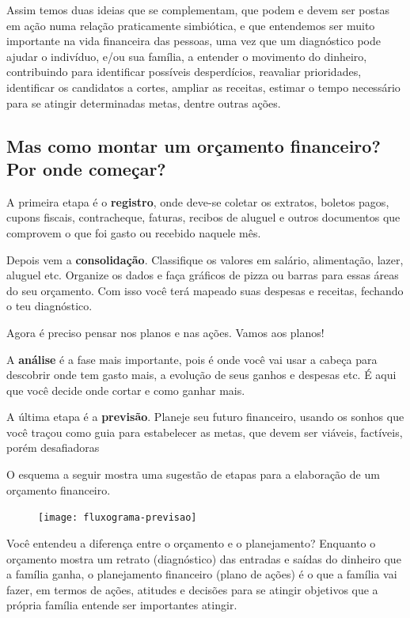 Assim temos duas ideias que se complementam, que podem e devem ser postas em ação numa relação praticamente simbiótica, e que entendemos ser muito importante na vida financeira das pessoas, uma vez que um diagnóstico pode ajudar o indivíduo, e/ou sua família, a entender o movimento do dinheiro, contribuindo para identificar possíveis desperdícios, reavaliar prioridades, identificar os candidatos a cortes, ampliar as receitas, estimar o tempo necessário para se atingir determinadas metas, dentre outras ações.

\subsection{Mas como montar um orçamento financeiro? Por onde começar?}

A primeira etapa é o \textbf{registro}, onde deve-se coletar os extratos, boletos pagos, cupons fiscais, contracheque, faturas, recibos de aluguel e outros documentos que comprovem o que foi gasto ou recebido naquele mês.

Depois vem a \textbf{consolidação}. Classifique os valores em salário, alimentação, lazer, aluguel etc. Organize os dados e faça gráficos de pizza ou barras para essas áreas do seu orçamento. Com isso você terá mapeado suas despesas e receitas, fechando o teu diagnóstico.

Agora é preciso pensar nos planos e nas ações. Vamos aos planos!

A \textbf{análise} é a fase mais importante, pois é onde você vai usar a cabeça para descobrir onde tem gasto mais, a evolução de seus ganhos e despesas etc. É aqui que você decide onde cortar e como ganhar mais.   

A última etapa é a \textbf{previsão}. Planeje seu futuro financeiro, usando os sonhos que você traçou como guia para estabelecer as metas, que devem ser viáveis, factíveis, porém desafiadoras

O esquema a seguir mostra uma sugestão de etapas para a elaboração de um orçamento financeiro. 

\begin{figure}[H]
\centering
\texttt{[image: fluxograma-previsao]}

\caption{\cite{zentgraf2015}}
\end{figure}

Você entendeu a diferença entre o orçamento e o planejamento? Enquanto o orçamento mostra um retrato (diagnóstico) das entradas e saídas do dinheiro que a família ganha, o planejamento financeiro (plano de ações) é o que a família vai fazer, em termos de ações, atitudes e decisões para se atingir objetivos que a própria família entende ser importantes atingir. 

